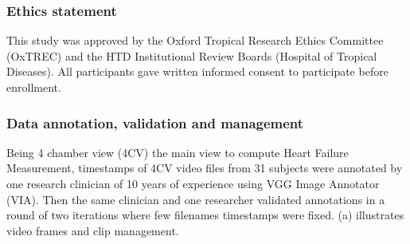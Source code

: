 \documentclass[mlabstract,twocolumn]{jmlr}
\begin{document}
\subsubsection{Ethics statement}
This study was approved by the Oxford Tropical Research Ethics Committee (OxTREC) and the HTD Institutional Review Boards (Hospital of Tropical Diseases).
All participants gave written informed consent to participate before enrollment.

\subsubsection{Data annotation, validation and management}
Being 4 chamber view (4CV) the main view to compute Heart Failure Measurement, timestamps of 4CV video files from 31 subjects were annotated by one research clinician of 10 years of experience using VGG Image Annotator (VIA).
Then the same clinician  and one researcher validated annotations in a round of two iterations where few filenames timestamps were fixed.
(a) illustrates video frames and clip management.
\end{document}
